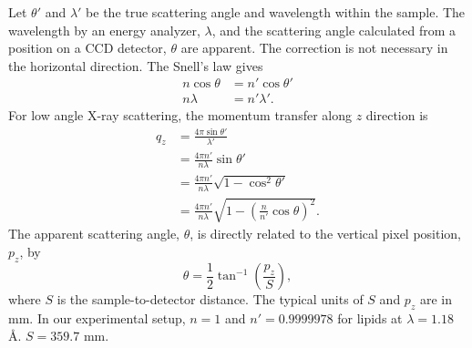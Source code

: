 Let $\theta'$ and $\lambda'$ be the true scattering angle and wavelength
within the sample. The wavelength by an energy analyzer, $\lambda$, and the 
scattering angle calculated from a position on a CCD detector, $\theta$ are 
apparent. The correction is not necessary in the horizontal direction.
The Snell's law gives
\begin{align}
  n\cos\theta &= n'\cos\theta' \\
  n\lambda &= n'\lambda'.
\end{align}
For low angle X-ray scattering, the momentum transfer along $z$ direction is
\begin{align}
  q_z &= \frac{4\pi\sin\theta'}{\lambda'} \\
      &= \frac{4\pi n'}{n\lambda}\sin\theta' \\
      &= \frac{4\pi n'}{n\lambda}\sqrt{1-\cos^2\theta'} \\
      &= \frac{4\pi n'}{n\lambda}\sqrt{1-\left(\frac{n}{n'}\cos\theta\right)^2}.
\end{align}
The apparent scattering angle, $\theta$, is directly related to the vertical
pixel position, $p_z$, by 
\begin{equation}
  \theta = \frac{1}{2}\tan^{-1}\left(\frac{p_z}{S}\right),
\end{equation}
where $S$ is the sample-to-detector distance. The typical units of $S$ and 
$p_z$ are in mm. In our experimental setup,
$n=1$ and $n'=0.9999978$ for lipids at $\lambda=1.18$ \AA. 
$S=359.7$ mm.

